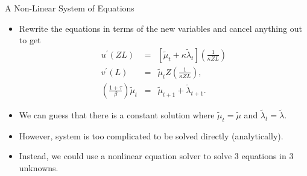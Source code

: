 \documentclass[10pt,c,aspectratio=1610,handout]{beamer}
\begin{document}
\begin{frame}{A Non-Linear System of Equations}%
  \begin{itemize}%
    \item[$\blacktriangleright$] Rewrite the equations in terms of the new variables and cancel anything out to get%
      \begin{eqnarray}%
        u^{\prime }(ZL) &=&\left[ \tilde{\mu}_{t}+\kappa \tilde{\lambda}_{t}\right] \left( \frac{1}{\kappa ZL}\right) \label{eq:Vel1} \\%
        v^{\prime }(L) &=&\tilde{\mu}_{t}Z\left( \frac{1}{\kappa ZL}\right) , \label{eq:Vel2} \\%
        \left( \frac{1+\tau }{\beta }\right) \tilde{\mu}_{t} &=&\tilde{\mu}_{t+1}+ \tilde{\lambda}_{t+1}. \label{eq:Vel3}%
      \end{eqnarray}%
    \pause%
    \item[$\blacktriangleright$] We can guess that there is a constant solution where $\tilde{\mu}_{t}=\tilde{\mu}$ and $\tilde{\lambda}_{t}=\tilde{\lambda}.$%
    \item[$\blacktriangleright$] However, system is too complicated to be solved directly (analytically).%
    \pause%
    \item[$\blacktriangleright$] Instead, we could use a nonlinear equation solver to solve 3 equations in 3 unknowns.%
  \end{itemize}%
\end{frame}%
\end{document}
